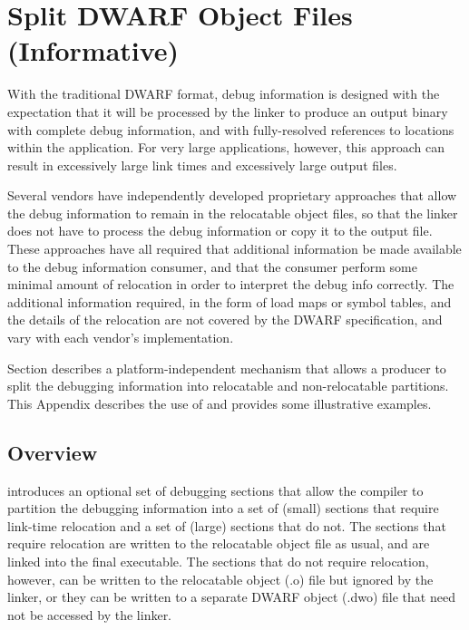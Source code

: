 \chapter[Split DWARF Object Files (Informative)]{Split DWARF Object Files (Informative)}
\label{app:splitdwarfobjectsinformative}
With the traditional DWARF format, debug information is designed
with the expectation that it will be processed by the linker to
produce an output binary with complete debug information, and
with fully-resolved references to locations within the
application. For very large applications, however, this approach
can result in excessively large link times and excessively large
output files. 

Several vendors have independently developed
proprietary approaches that allow the debug information to remain
in the relocatable object files, so that the linker does not have
to process the debug information or copy it to the output file.
These approaches have all required that additional information be
made available to the debug information consumer, and that the
consumer perform some minimal amount of relocation in order to
interpret the debug info correctly. The additional information
required, in the form of load maps or symbol tables, and the
details of the relocation are not covered by the DWARF
specification, and vary with each vendor's implementation.

Section  describes a
platform-independent mechanism that allows a producer to
split the debugging information into relocatable and
non-relocatable partitions. This Appendix describes the use
of  and provides some illustrative
examples.

\section{Overview}
\label{app:splitoverview}
\DWARFVersionV{} introduces an optional set of debugging sections
that allow the compiler to partition the debugging information
into a set of (small) sections that require link-time relocation
and a set of (large) sections that do not. The sections that
require relocation are written to the relocatable object file as
usual, and are linked into the final executable. The sections
that do not require relocation, however, can be written to the
relocatable object (.o) file but ignored by the linker, or they
can be written to a separate DWARF object (.dwo{}) 
 file
\bb
that need not be accessed by the linker.
\eb

